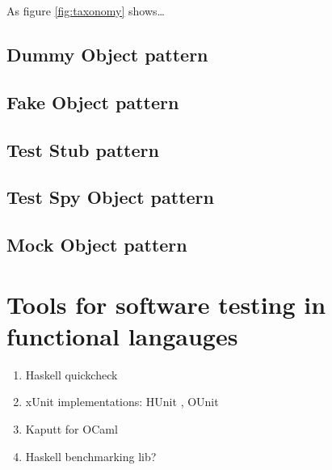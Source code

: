 As figure \ref{fig:taxonomy} shows\dots

\subsection{Dummy Object pattern}
\label{testdoubles:dummy}

\subsection{Fake Object pattern}
\label{testdoubles:fake}

\subsection{Test Stub pattern}
\label{testdoubles:stub}

\subsection{Test Spy Object pattern}
\label{testdoubles:spy}

\subsection{Mock Object pattern}
\label{testdoubles:mocks}

\section{Tools for software testing in functional langauges}
\label{testtools}

\begin{enumerate}
\item Haskell quickcheck \cite{claessen:quickcheck}
\item xUnit implementations: HUnit \cite{www:hunit}, OUnit \cite{www:ounit}
\item Kaputt for OCaml \cite{www:kaputt}
\item Haskell benchmarking lib? \cite{www:criterion}
\end{enumerate}
